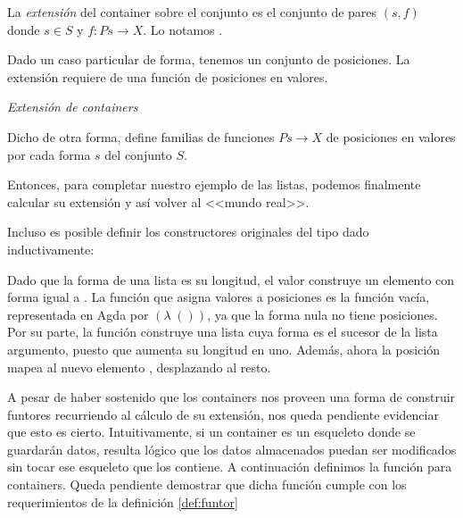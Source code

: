 \vspace{2ex}

\begin{definition}
  La {\it extensión} del container  sobre el conjunto  es el conjunto de pares $(s, f)$ donde $s \in S$ y $f : Ps \to X$.
  Lo notamos .

Dado un caso particular de forma, tenemos un conjunto de posiciones. La extensión requiere de una función de posiciones en valores. 

\begin{agdacode}\label{code:cont:ext}{\it Extensión de containers}

\end{agdacode}

Dicho de otra forma, 
define familias de funciones $P s \to X$ de posiciones en valores por cada forma $s$ del conjunto $S$.
\end{definition}

\begin{example}
Entonces, para completar nuestro ejemplo de las listas, podemos finalmente calcular su extensión y así volver al <<mundo real>>. 


Incluso es posible definir los constructores originales del tipo  dado inductivamente:


Dado que la forma de una lista es su longitud, el valor 
 construye un elemento con forma igual a . La función que asigna valores a posiciones es la función vacía, representada en Agda por $(\lambda\; ())$, ya que la forma nula no tiene posiciones.
Por su parte, la función   construye una lista cuya forma es el sucesor de la lista argumento, puesto que  aumenta su longitud en uno. Además, ahora la posición  mapea al nuevo elemento , desplazando al resto.
\end{example}

  A pesar de haber sostenido que los containers nos proveen una forma de construir funtores recurriendo al cálculo de su extensión, nos queda pendiente evidenciar que esto es cierto. Intuitivamente, si un container es un esqueleto donde se guardarán datos, resulta lógico que los datos almacenados puedan ser modificados sin tocar ese esqueleto que los contiene.
  A continuación definimos la función  para containers. Queda pendiente demostrar que dicha función cumple con los requerimientos de la definición \ref{def:funtor}

